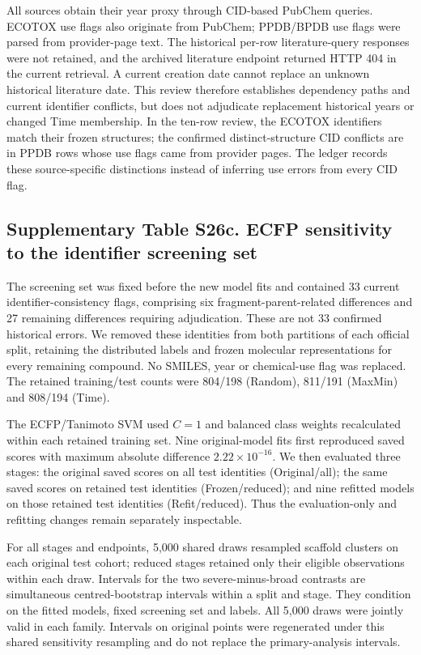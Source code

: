 All sources obtain their year proxy through CID-based PubChem
queries. ECOTOX use flags also originate from PubChem; PPDB/BPDB use flags were
parsed from provider-page text. The historical per-row literature-query responses
were not retained, and the archived literature endpoint returned HTTP 404 in the
current retrieval. A current creation date cannot replace an unknown historical
literature date. This review therefore establishes dependency paths and current
identifier conflicts, but does not adjudicate replacement historical years or
changed Time membership. In the ten-row review, the ECOTOX identifiers match
their frozen structures; the confirmed distinct-structure CID conflicts are in
PPDB rows whose use flags came from provider pages. The ledger records these
source-specific distinctions instead of inferring use errors from every CID flag.

\subsection*{Supplementary Table S26c. ECFP sensitivity to the identifier screening set}

The screening set was fixed before the new model fits and contained 33 current identifier-consistency flags, comprising six fragment-parent-related differences and 27 remaining differences requiring adjudication. These are not 33 confirmed historical errors. We removed these identities from both partitions of each official split, retaining the distributed labels and frozen molecular representations for every remaining compound. No SMILES, year or chemical-use flag was replaced. The retained training/test counts were 804/198 (Random), 811/191 (MaxMin) and 808/194 (Time).

The ECFP/Tanimoto SVM used $C=1$ and balanced class weights recalculated within each retained training set. Nine original-model fits first reproduced saved scores with maximum absolute difference $2.22\times10^{-16}$. We then evaluated three stages: the original saved scores on all test identities (Original/all); the same saved scores on retained test identities (Frozen/reduced); and nine refitted models on those retained test identities (Refit/reduced). Thus the evaluation-only and refitting changes remain separately inspectable.

For all stages and endpoints, 5,000 shared draws resampled scaffold clusters on each original test cohort; reduced stages retained only their eligible observations within each draw. Intervals for the two severe-minus-broad contrasts are simultaneous centred-bootstrap intervals within a split and stage. They condition on the fitted models, fixed screening set and labels. All 5,000 draws were jointly valid in each family. Intervals on original points were regenerated under this shared sensitivity resampling and do not replace the primary-analysis intervals.


